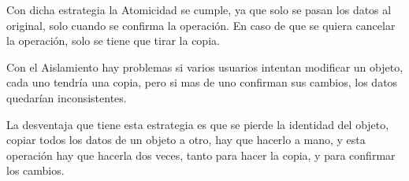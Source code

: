 		Con dicha estrategia la Atomicidad se cumple, ya que solo se pasan los datos
		al original, solo cuando se confirma la operación.
		En caso de que se quiera cancelar la operación, solo se tiene que tirar la
		copia.
		
		Con el Aislamiento hay problemas si varios usuarios intentan modificar un
		objeto, cada uno tendría una copia, pero si mas de uno confirman sus cambios,
		los datos quedarían inconsistentes.
		
		La desventaja que tiene esta estrategia es que se pierde la identidad del
		objeto, copiar todos los datos de un objeto a otro, hay que hacerlo a mano, y
		esta operación hay que hacerla dos veces, tanto para hacer la copia, y para
		confirmar los cambios.
